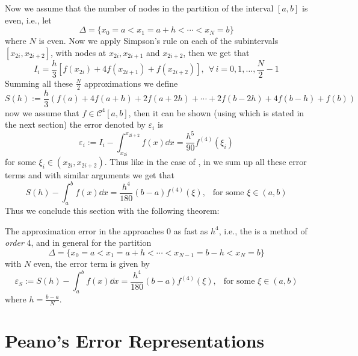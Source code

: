 Now we assume that the number of nodes in the partition of the interval $[a,b]$ is even, i.e., let 
\[
    \Delta = \{ x_0 = a < x_1 = a+h < \cdots < x_N = b \}  
\]
where $N$ is even. Now we apply Simpson's rule on each of the subintervals $[x_{2i}, x_{2i+2}]$, with nodes at $x_{2i}, x_{2i+1}$ and $x_{2i+2}$, then we get that 
\[
    I_i = \frac{h}{3} [f(x_{2i}) + 4f(x_{2i+1}) + f(x_{2i+2})],\  \ \forall \, i = 0,1,\dots, \frac{N}{2}-1
\]
Summing all these $\frac{N}{2}$ approximations we define 
\begin{equation}\label{eq5:apr4A}
    S(h) := \frac{h}{3}\left( f(a) + 4f(a+h) + 2f(a+2h) + \cdots + 2f(b-2h) + 4f(b-h) + f(b) \right)
\end{equation}
now we assume that $f \in \mathcal{C}^4[a,b]$, then it can be shown (using  which is stated in the next section) the error denoted by $\varepsilon_i$ is 
\begin{equation}\label{eq6:apr4A}
    \varepsilon_i := I_i - \int_{x_{2i}}^{x_{2i+2}} f(x) \dd{x} = \frac{h^5}{90} f^{(4)}(\xi_i)
\end{equation} 
for some $\xi_i \in (x_{2i},x_{2i+2})$. Thus like in the case of , in we sum up all these error terms and with similar arguments we get that 
 \begin{equation}\label{eq7:apr4A}
    S(h) - \int_a^b f(x) \dd{x} = \frac{h^4}{180}(b-a) f^{(4)}(\xi), \ \ \mbox{ for some } \xi \in (a,b)
 \end{equation}
 Thus we conclude this section with the following theorem: 
 \begin{thm}\label{thm2:apr4A}
    The approximation error in the  approaches $0$ as fast as $h^4$, i.e., the  is a method of \textit{order} $4$, and in general for the partition 
    \[
        \Delta = \{ x_0 = a < x_1 = a+h < \cdots < x_{N-1} = b-h < x_N = b \}    
    \]
    with $N$ even, the error term is given by 
    \[
        \varepsilon_S := S(h) - \int_a^b f(x) \dd{x} = \frac{h^4}{180}(b-a) f^{(4)}(\xi), \ \ \mbox{ for some } \xi \in (a,b)  
    \]
    where $h = \frac{b-a}{N}$.
 \end{thm}

\section{Peano's Error Representations}

